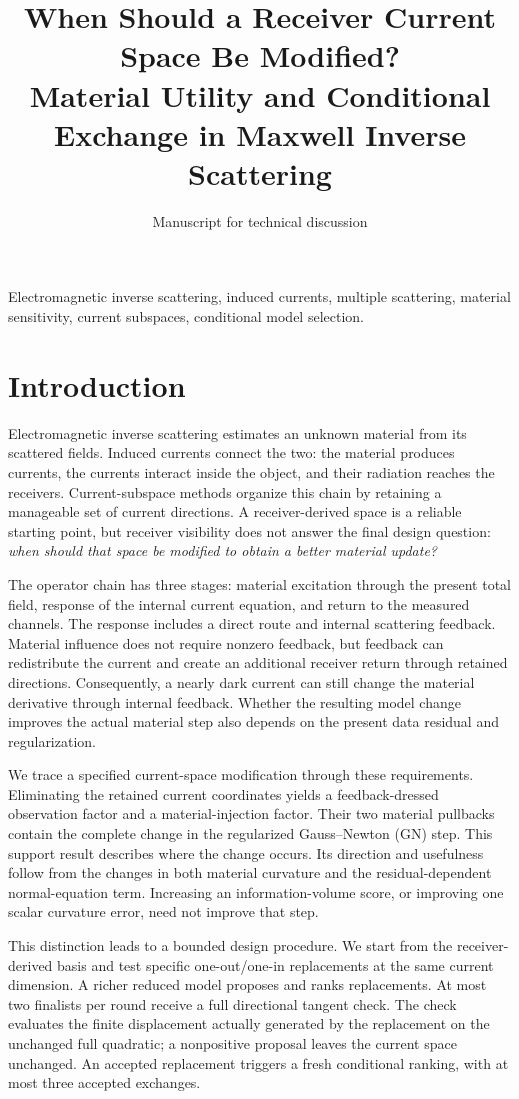 \documentclass[journal]{IEEEtran}
\title{When Should a Receiver Current Space Be Modified?\\Material Utility and Conditional Exchange in Maxwell Inverse Scattering}
\author{Manuscript for technical discussion}
\begin{document}
\raggedbottom\maketitle

\begin{IEEEkeywords}Electromagnetic inverse scattering, induced currents, multiple scattering, material sensitivity, current subspaces, conditional model selection.\end{IEEEkeywords}
\section{Introduction}
Electromagnetic inverse scattering estimates an unknown material from its scattered fields. Induced currents connect the two: the material produces currents, the currents interact inside the object, and their radiation reaches the receivers. Current-subspace methods organize this chain by retaining a manageable set of current directions. A receiver-derived space is a reliable starting point, but receiver visibility does not answer the final design question: \emph{when should that space be modified to obtain a better material update?}

The operator chain has three stages: material excitation through the present total field, response of the internal current equation, and return to the measured channels. The response includes a direct route and internal scattering feedback. Material influence does not require nonzero feedback, but feedback can redistribute the current and create an additional receiver return through retained directions. Consequently, a nearly dark current can still change the material derivative through internal feedback. Whether the resulting model change improves the actual material step also depends on the present data residual and regularization.

We trace a specified current-space modification through these requirements. Eliminating the retained current coordinates yields a feedback-dressed observation factor and a material-injection factor. Their two material pullbacks contain the complete change in the regularized Gauss--Newton (GN) step. This support result describes where the change occurs. Its direction and usefulness follow from the changes in both material curvature and the residual-dependent normal-equation term. Increasing an information-volume score, or improving one scalar curvature error, need not improve that step.

This distinction leads to a bounded design procedure. We start from the receiver-derived basis and test specific one-out/one-in replacements at the same current dimension. A richer reduced model proposes and ranks replacements. At most two finalists per round receive a full directional tangent check. The check evaluates the finite displacement actually generated by the replacement on the unchanged full quadratic; a nonpositive proposal leaves the current space unchanged. An accepted replacement triggers a fresh conditional ranking, with at most three accepted exchanges.
\end{document}
